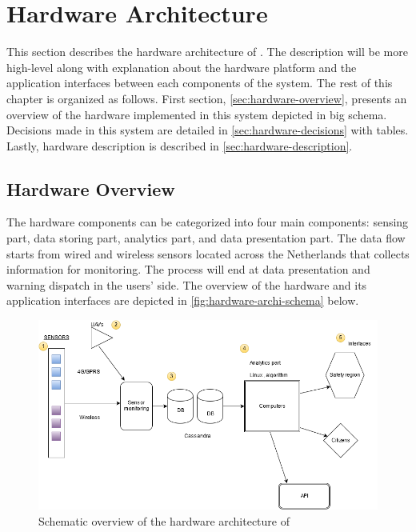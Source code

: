 \chapter{Hardware Architecture}
\label{ch:hardware}
This section describes the hardware architecture of \ProjectName{}. The description will be more high-level along with explanation about the hardware platform and the application interfaces between each components of the system. The rest of this chapter is organized as follows. First section, \autoref{sec:hardware-overview}, presents an overview of the hardware implemented in this system depicted in big schema. Decisions made in this system are detailed in \autoref{sec:hardware-decisions} with tables. Lastly, hardware description is described in \autoref{sec:hardware-description}.

\section{Hardware Overview}
\label{sec:hardware-overview}
The \ProjectName{} hardware components can be categorized into four main components: sensing part, data storing part, analytics part, and data presentation part. The data flow starts from wired and wireless sensors located across the Netherlands that collects information for monitoring. The process will end at data presentation and warning dispatch in the users' side. The overview of the hardware and its application interfaces are depicted in \autoref{fig:hardware-archi-schema} below.

\begin{figure}[hb!]
\centering
\includegraphics[scale=0.5]{images/HardwareArchitectureOverview.png}
\caption{Schematic overview of the hardware architecture of \ProjectName{}}
\label{fig:hardware-archi-schema}
\end{figure}

